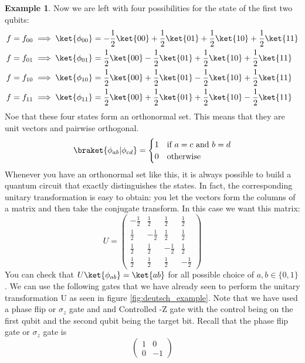 \documentclass[12pt, oneside]{book}
\theoremstyle{definition}
\theoremstyle{definition}
\newtheorem{example}{Example}[section]
\theoremstyle{remark}
\begin{document}
\begin{example}
Now we are left with four possibilities for the state of the first two qubits:
\begin{align*}
&f=f_{00} \implies \ket{\phi_{00}}=-\frac{1}{2}\ket{00}+\frac{1}{2}\ket{01}+\frac{1}{2}\ket{10}+\frac{1}{2}\ket{11}\\
&f=f_{01} \implies \ket{\phi_{01}}=\frac{1}{2}\ket{00}-\frac{1}{2}\ket{01}+\frac{1}{2}\ket{10}+\frac{1}{2}\ket{11}\\
&f=f_{10} \implies \ket{\phi_{10}}=\frac{1}{2}\ket{00}+\frac{1}{2}\ket{01}-\frac{1}{2}\ket{10}+\frac{1}{2}\ket{11}\\
&f=f_{11} \implies \ket{\phi_{11}}=\frac{1}{2}\ket{00}+\frac{1}{2}\ket{01}+\frac{1}{2}\ket{10}-\frac{1}{2}\ket{11}
\end{align*}
Noe that these four states form an orthonormal set. This means that they are unit vectors and pairwise orthogonal.
\[
\braket{\phi_{ab}|\phi_{cd}}=\begin{cases} 1 & \text{if $a=c$ and $b=d$} \\ 0 & \text{otherwise} \end{cases}
\]
Whenever you have an orthonormal set like this, it is always possible to build a quantum circuit that exactly distinguishes the states. In fact, the corresponding unitary transformation is easy to obtain: you let the vectors form the columns of a matrix and then take the conjugate transform. In this case we want this matrix:
\[
U=\begin{pmatrix} -\frac{1}{2} &\frac{1}{2} & \frac{1}{2} & \frac{1}{2} \\ \frac{1}{2} & -\frac{1}{2} & \frac{1}{2} & \frac{1}{2} \\ \frac{1}{2} & \frac{1}{2} & -\frac{1}{2} & \frac{1}{2} \\ \frac{1}{2} & \frac{1}{2} & \frac{1}{2} & -\frac{1}{2} \end{pmatrix}
\]
You can check that $U\ket{\phi_{ab}}=\ket{ab}$ for all possible choice of $a,b\in\{0,1\}$. We can use the following gates that we have already seen to perform the unitary transformation U as seen in figure \ref{fig:deutsch_example}.
Note that we have used a phase flip or $\sigma_z$ gate and and Controlled -Z gate with the control being on the first qubit and the second qubit being the target bit. Recall that the phase flip gate or $\sigma_z$ gate is
\[
\begin{pmatrix} 1 & 0 \\ 0 & -1 \end{pmatrix}
\]
\end{example}
\end{document}
